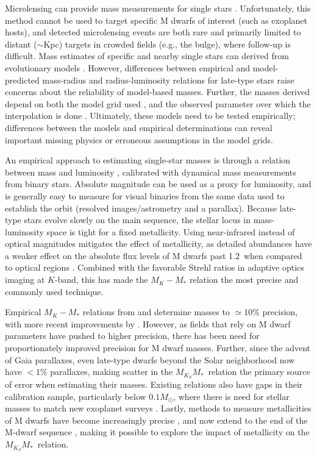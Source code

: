\documentclass[twocolumn]{aastex62}
\newcommand{\mmk}{$M_{K_S}$\textendash$M_*$}
\begin{document}
Microlensing can provide mass measurements for single stars \citep[e.g.,][]{2016ApJ...825...60Z,2017ApJ...838..154C,2017AJ....154..176S}. Unfortunately, this method cannot be used to target specific M dwarfs of interest (such as exoplanet hosts), and detected microlensing events are both rare and primarily limited to distant ($\sim$Kpc) targets in crowded fields (e.g., the bulge), where follow-up is difficult. Mass estimates of specific and nearby single stars can derived from evolutionary models \citep[e.g.,][]{Muirhead2012a,2012ApJ...747...69C}. However, differences between empirical and model-predicted mass-radius and radius-luminosity relations for late-type stars \citep[e.g.,][]{Boyajian2012,Feiden2012a} raise concerns about the reliability of model-based masses. Further, the masses derived depend on both the model grid used \citep{Spada2013,MIST1}, and the observed parameter over which the interpolation is done \citep[e.g., color versus luminosity,][]{Mann:2012,Mann2015b}. Ultimately, these models need to be tested empirically; differences between the models and empirical determinations can reveal important missing physics or erroneous assumptions in the model grids. 

An empirical approach to estimating single-star masses is through a relation between mass and luminosity \citep[e.g.,][]{Henry:1993fk, Delfosse2000}, calibrated with dynamical mass measurements from binary stars. Absolute magnitude can be used as a proxy for luminosity, and is generally easy to measure for visual binaries from the same data used to establish the orbit (resolved images/astrometry and a parallax). Because late-type stars evolve slowly on the main sequence, the stellar locus in mass-luminosity space is tight for a fixed metallicity. Using near-infrared instead of optical magnitudes mitigates the effect of metallicity, as detailed abundances have a weaker effect on the absolute flux levels of M dwarfs past 1.2\um\ when compared to optical regions \citep{2005A&A...442..635B,Delfosse2000}. Combined with the favorable Strehl ratios in adaptive optics imaging at $K$-band, this has made the $M_K-M_*$ relation the most precise and commonly used technique. 

Empirical $M_K-M_*$ relations from \citet{Henry:1993fk} and \citet{Delfosse2000} determine masses to $\simeq$10\% precision, with more recent improvements by \citet{Benedict2016}. However, as fields that rely on M dwarf parameters have pushed to higher precision, there has been need for proportionately improved precision for M dwarf masses. Further, since the advent of Gaia parallaxes, even late-type dwarfs beyond the Solar neighborhood now have $<1\%$ parallaxes, making scatter in the \mmk\ relation the primary source of error when estimating their masses. Existing relations also have gaps in their calibration sample, particularly below $0.1M_\odot$, where there is need for stellar masses to match new exoplanet surveys \citep[e.g.,][]{2017Natur.542..456G}. Lastly, methods to measure metallicities of M dwarfs have become increasingly precise \citep[e.g.,][]{2010ApJ...720L.113R, 2014A&A...568A.121N}, and now extend to the end of the M-dwarf sequence \citep{Mann2014}, making it possible to explore the impact of metallicity on the \mmk\ relation. 
\end{document}
